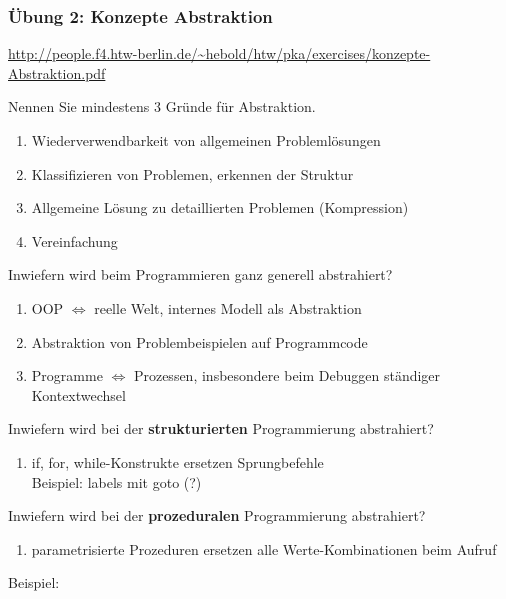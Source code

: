 \begin{card}
	\frametitle{Übung 2: Konzepte Abstraktion}
	\url{http://people.f4.htw-berlin.de/~hebold/htw/pka/exercises/konzepte-Abstraktion.pdf}
\end{card}

\begin{card}
	Nennen Sie mindestens 3 Gründe für Abstraktion.
	\hr
	\begin{enumerate}
	\item Wiederverwendbarkeit von allgemeinen Problemlösungen
	\item Klassifizieren von Problemen, erkennen der Struktur
	\item Allgemeine Lösung zu detaillierten Problemen (Kompression)
	\item Vereinfachung
	\end{enumerate}
\end{card}

\begin{card}
	Inwiefern wird beim Programmieren ganz generell abstrahiert?
	\hr
	\begin{enumerate}
	\item OOP $\Leftrightarrow$ reelle Welt, internes Modell als Abstraktion
	\item Abstraktion von Problembeispielen auf Programmcode
	\item Programme $\Leftrightarrow$ Prozessen, insbesondere beim Debuggen ständiger Kontextwechsel
	\end{enumerate}
\end{card}

\begin{card}
	Inwiefern wird bei der \textbf{strukturierten} Programmierung abstrahiert?
	\hr
	\begin{enumerate}
	\item if, for, while-Konstrukte ersetzen Sprungbefehle\\
		Beispiel: labels mit goto (?)
	\end{enumerate}
\end{card}

\begin{card}
	Inwiefern wird bei der \textbf{prozeduralen} Programmierung abstrahiert?
	\hr
	\begin{enumerate}
	\item parametrisierte Prozeduren ersetzen alle Werte-Kombinationen beim Aufruf
	\end{enumerate}
	Beispiel:
\end{card}


